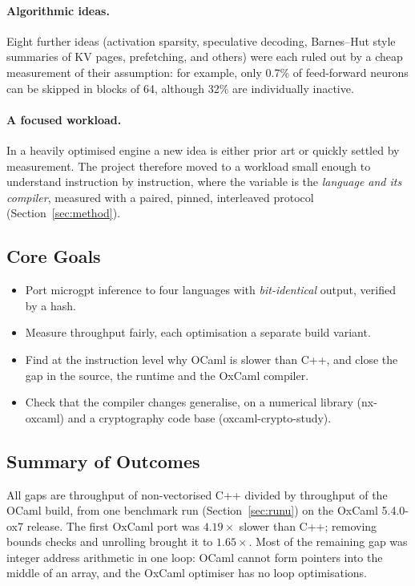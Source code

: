 \paragraph{Algorithmic ideas.} Eight further ideas (activation sparsity,
speculative decoding, Barnes--Hut style summaries of KV pages, prefetching, and
others) were each ruled out by a cheap measurement of their assumption: for
example, only 0.7\% of feed-forward neurons can be skipped in blocks of 64,
although 32\% are individually inactive.

\paragraph{A focused workload.} In a heavily optimised engine a new idea is
either prior art or quickly settled by measurement. The project therefore
moved to a workload small enough to understand instruction by instruction,
where the variable is the \emph{language and its compiler}, measured with a
paired, pinned, interleaved protocol (Section~\ref{sec:method}).

\subsection{Core Goals}
\begin{itemize}
  \item Port microgpt inference to four languages with \emph{bit-identical}
        output, verified by a hash.
  \item Measure throughput fairly, each optimisation a separate build variant.
  \item Find at the instruction level why OCaml is slower than C++, and close
        the gap in the source, the runtime and the OxCaml compiler.
  \item Check that the compiler changes generalise, on a numerical library
        (nx-oxcaml) and a cryptography code base (oxcaml-crypto-study).
\end{itemize}

\subsection{Summary of Outcomes}
All gaps are throughput of non-vectorised C++ divided by throughput of the
OCaml build, from one benchmark run (Section~\ref{sec:runu}) on the OxCaml
5.4.0-ox7 release. The first OxCaml port was $4.19\times$ slower
than C++; removing bounds checks and unrolling brought it to
$1.65\times$. Most of the remaining gap was integer address
arithmetic in one loop: OCaml cannot form pointers into the middle of an
array, and the OxCaml optimiser has no loop optimisations.

